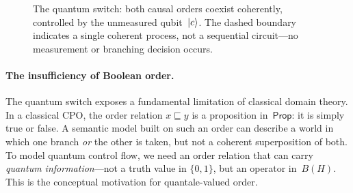 \begin{figure}[ht]
\centering
{}
\caption{The quantum switch: both causal orders coexist coherently,
  controlled by the unmeasured qubit~$\ket{c}$.
  The dashed boundary indicates a single coherent process, not a
  sequential circuit---no measurement or branching decision occurs.}
\label{fig:quantum-switch}
\end{figure}

\paragraph{The insufficiency of Boolean order.}
The quantum switch exposes a fundamental limitation of classical
domain theory.
In a classical CPO, the order relation $x \sqsubseteq y$ is a
proposition in~$\mathsf{Prop}$: it is simply true or false.
A semantic model built on such an order can describe a world in which
one branch \emph{or} the other is taken, but not a coherent
superposition of both.
To model quantum control flow, we need an order relation that can
carry \emph{quantum information}---not a truth value in
$\{0, 1\}$, but an operator in~$B(H)$.
This is the conceptual motivation for quantale-valued order.

